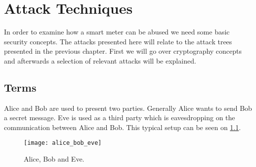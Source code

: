 \chapter{Attack Techniques}\label{attack_techniques}

In order to examine how a smart meter can be abused we need some basic security concepts.
The attacks presented here will relate to the attack trees presented in the previous chapter.
First we will go over cryptography concepts and afterwards a selection of relevant attacks will be explained.

\section{Terms}
Alice and Bob are used to present two parties.
Generally Alice wants to send Bob a secret message.
Eve is used as a third party which is eavesdropping on the communication between Alice and Bob.
This typical setup can be seen on \cref{alice_bob_eve}.

\begin{figure}[H]
  \begin{center}
    \texttt{[image: alice\_bob\_eve]}
  \end{center}
  \caption[wat]{Alice, Bob and Eve.\footnotemark}
  \label{alice_bob_eve}
\end{figure}
